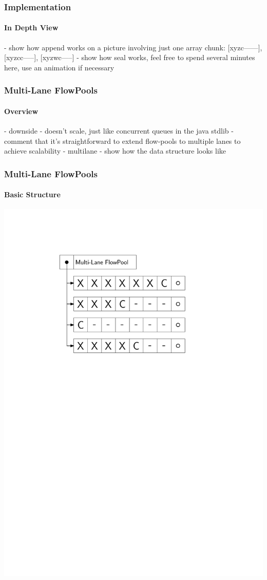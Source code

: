 \documentclass{beamer}
\begin{document}
\begin{frame}
  \frametitle{Implementation}
  \framesubtitle{In Depth View}

- show how append works on a picture involving just one array chunk:        [xyzc------], [xyzcc-----], [xyzwc-----]   
- show how seal works, feel free to spend several minutes here, use an animation if necessary


\end{frame}

\begin{frame}
  \frametitle{Multi-Lane FlowPools}
  \framesubtitle{Overview}

- downside - doesn't scale, just like concurrent queues in the java stdlib
- comment that it's straightforward to extend flow-pools to multiple lanes to achieve scalability
- multilane - show how the data structure looks like

\end{frame}

\begin{frame}
  \frametitle{Multi-Lane FlowPools}
  \framesubtitle{Basic Structure}
  \centering
  \includegraphics{figs/MLFP}
\end{frame}
\end{document}
